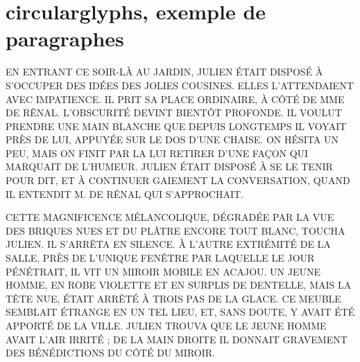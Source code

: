 \documentclass[french,11pt,a4paper]{article}
\begin{document}
\part*{circularglyphs, exemple de paragraphes}

\medskip

EN ENTRANT CE SOIR-LÀ AU JARDIN, JULIEN ÉTAIT DISPOSÉ À S'OCCUPER DES IDÉES DES JOLIES COUSINES. ELLES L'ATTENDAIENT AVEC IMPATIENCE. IL PRIT SA PLACE ORDINAIRE, À CÔTÉ DE MME DE RÊNAL. L'OBSCURITÉ DEVINT BIENTÔT PROFONDE. IL VOULUT PRENDRE UNE MAIN BLANCHE QUE DEPUIS LONGTEMPS IL VOYAIT PRÈS DE LUI, APPUYÉE SUR LE DOS D'UNE CHAISE. ON HÉSITA UN PEU, MAIS ON FINIT PAR LA LUI RETIRER D'UNE FAÇON QUI MARQUAIT DE L'HUMEUR. JULIEN ÉTAIT DISPOSÉ À SE LE TENIR POUR DIT, ET À CONTINUER GAIEMENT LA CONVERSATION, QUAND IL ENTENDIT M. DE RÊNAL QUI S'APPROCHAIT.\par

\medskip

\noindent\textcolor{red}{}

\medskip

CETTE MAGNIFICENCE MÉLANCOLIQUE, DÉGRADÉE PAR LA VUE DES BRIQUES NUES ET DU PLÂTRE ENCORE TOUT BLANC, TOUCHA JULIEN. IL S'ARRÊTA EN SILENCE. À L'AUTRE EXTRÉMITÉ DE LA SALLE, PRÈS DE L'UNIQUE FENÊTRE PAR LAQUELLE LE JOUR PÉNÉTRAIT, IL VIT UN MIROIR MOBILE EN ACAJOU. UN JEUNE HOMME, EN ROBE VIOLETTE ET EN SURPLIS DE DENTELLE, MAIS LA TÊTE NUE, ÉTAIT ARRÊTÉ À TROIS PAS DE LA GLACE. CE MEUBLE SEMBLAIT ÉTRANGE EN UN TEL LIEU, ET, SANS DOUTE, Y AVAIT ÉTÉ APPORTÉ DE LA VILLE. JULIEN TROUVA QUE LE JEUNE HOMME AVAIT L'AIR IRRITÉ ; DE LA MAIN DROITE IL DONNAIT GRAVEMENT DES BÉNÉDICTIONS DU CÔTÉ DU MIROIR.\par

\medskip

\noindent\textcolor{orange}{}
\end{document}
